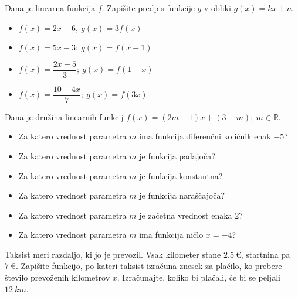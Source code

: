         
            \begin{naloga}
                Dana je linearna funkcija $f$. Zapišite predpis funkcije $g$ v obliki $g(x)=kx+n$.
                    \begin{itemize}
                        \item $f(x)=2x-6, ~ g(x)=3f(x)$ 
                        \item $f(x)=5x-3; ~ g(x)=f(x+1)$ 
                        \item $f(x)=\dfrac{2x-5}{3}; ~ g(x)=f(1-x)$ 
                        \item $f(x)=\dfrac{10-4x}{7}; ~ g(x)=f(3x)$ 
                    \end{itemize}
            \end{naloga}
        


        
            \begin{naloga}
                Dana je družina linearnih funkcij $f(x)=(2m-1)x+(3-m); ~m\in\mathbb{R}$.
                    \begin{itemize}
                        \item Za katero vrednost parametra $m$ ima funkcija diferenčni količnik enak $-5$? 
                        \item Za katero vrednost parametra $m$ je funkcija padajoča?
                        \item Za katero vrednost parametra $m$ je funkcija konstantna? 
                        \item Za katero vrednost parametra $m$ je funkcija naraščajoča? 
                        \item Za katero vrednost parametra $m$ je začetna vrednost enaka $2$? 
                        \item Za katero vrednost parametra $m$ ima funkcija ničlo $x=-4$? 
                    \end{itemize}
            \end{naloga}
        


        
            \begin{naloga}
                Taksist meri razdaljo, ki jo je prevozil. Vsak kilometer stane $2.5~€$, startnina pa $7~€$.
                Zapišite funkcijo, po kateri taksist izračuna znesek za plačilo, ko prebere število prevoženih kilometrov $x$. 
                Izračunajte, koliko bi plačali, če bi se peljali $12~km$. 
            \end{naloga}

